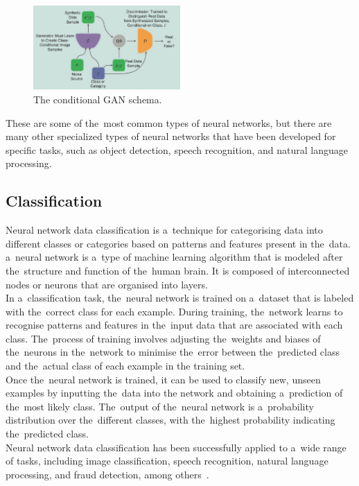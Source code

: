     \begin{center}
        \begin{figure}[!ht]
            \centering
            \includegraphics[width=0.5\textwidth]{figures/gan}
            \caption{The conditional GAN schema. \cite{creswell2018generative}}
            \label{fig:gan}
        \end{figure}
    \end{center}

These are some of the~most common types of neural networks, but there are many other specialized types of neural
networks that have been developed for specific tasks, such as object detection, speech recognition, and
natural language processing.\\

\subsection{Classification} \label{subsec:clasification}
Neural network data classification is a~technique for categorising data into different classes or categories based on
patterns and features present in the~data. a~neural network is a~type of machine learning algorithm that is modeled
after the~structure and function of the~human brain. It is composed of interconnected nodes or neurons that are
organised into layers.\\
In a~classification task, the~neural network is trained on a~dataset that is labeled with the~correct
class for each example. During training, the~network learns to recognise patterns and features in the~input data
that are associated with each class. The~process of training involves adjusting the~weights and biases of the~neurons
in the~network to minimise the~error between the~predicted class and the~actual class of each example in the
training set.\\
Once the~neural network is trained, it can be used to classify new, unseen examples by inputting the~data into
the network and obtaining a~prediction of the~most likely class. The~output of the~neural network is a~probability
distribution over the~different classes, with the~highest probability indicating the~predicted class.\\
Neural network data classification has been successfully applied to a~wide range of tasks, including image
classification, speech recognition, natural language processing, and fraud detection, among others~\cite{feraud2002methodology}.

